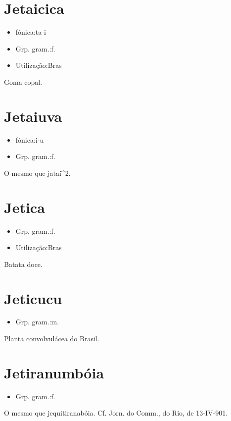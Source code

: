 \documentclass{article}
\begin{document}
\section{Jetaicica}
\begin{itemize}
\item {fónica:ta-i}
\end{itemize}
\begin{itemize}
\item {Grp. gram.:f.}
\end{itemize}
\begin{itemize}
\item {Utilização:Bras}
\end{itemize}
Goma copal.
\section{Jetaiuva}
\begin{itemize}
\item {fónica:i-u}
\end{itemize}
\begin{itemize}
\item {Grp. gram.:f.}
\end{itemize}
O mesmo que \textunderscore jataí\textunderscore ^2.
\section{Jetica}
\begin{itemize}
\item {Grp. gram.:f.}
\end{itemize}
\begin{itemize}
\item {Utilização:Bras}
\end{itemize}
Batata doce.
\section{Jeticucu}
\begin{itemize}
\item {Grp. gram.:m.}
\end{itemize}
Planta convolvulácea do Brasil.
\section{Jetiranumbóia}
\begin{itemize}
\item {Grp. gram.:f.}
\end{itemize}
O mesmo que \textunderscore jequitiranabóia\textunderscore . Cf. \textunderscore Jorn. do Comm.\textunderscore , do Rio, de 13-IV-901.
\end{document}
